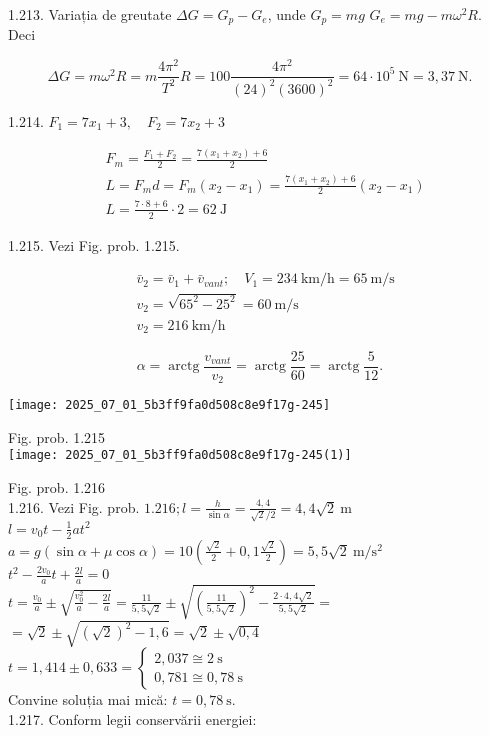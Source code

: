 1.213. Variația de greutate $\Delta G=G_{p}-G_{e}$, unde $G_{p}=m g$ $G_{e}=m g-m \omega^{2} R$. Deci

$$
\Delta G=m \omega^{2} R=m \frac{4 \pi^{2}}{T^{2}} R=100 \frac{4 \pi^{2}}{(24)^{2}(3600)^{2}}=64 \cdot 10^{5} \mathrm{~N}=3,37 \mathrm{~N} .
$$

1.214. $F_{1}=7 x_{1}+3, \quad F_{2}=7 x_{2}+3$

$$
\begin{aligned}
& F_{m}=\frac{F_{1}+F_{2}}{2}=\frac{7\left(x_{1}+x_{2}\right)+6}{2} \\
& L=F_{m} d=F_{m}\left(x_{2}-x_{1}\right)=\frac{7\left(x_{1}+x_{2}\right)+6}{2}\left(x_{2}-x_{1}\right) \\
& L=\frac{7 \cdot 8+6}{2} \cdot 2=62 \mathrm{~J}
\end{aligned}
$$

1.215. Vezi Fig. prob. 1.215.

$$
\begin{aligned}
& \bar{v}_{2}=\bar{v}_{1}+\bar{v}_{v a n t} ; \quad V_{1}=234 \mathrm{~km} / \mathrm{h}=65 \mathrm{~m} / \mathrm{s} \\
& v_{2}=\sqrt{65^{2}-25^{2}}=60 \mathrm{~m} / \mathrm{s} \\
& v_{2}=216 \mathrm{~km} / \mathrm{h}
\end{aligned}
$$

$$
\alpha=\operatorname{arctg} \frac{v_{v a n t}}{v_{2}}=\operatorname{arctg} \frac{25}{60}=\operatorname{arctg} \frac{5}{12} .
$$

\begin{center}
\texttt{[image: 2025\_07\_01\_5b3ff9fa0d508c8e9f17g-245]}
\end{center}

Fig. prob. 1.215\\
\texttt{[image: 2025\_07\_01\_5b3ff9fa0d508c8e9f17g-245(1)]}

Fig. prob. 1.216\\
1.216. Vezi Fig. prob. $1.216 ; l=\frac{h}{\sin \alpha}=\frac{4,4}{\sqrt{2} / 2}=4,4 \sqrt{2} \mathrm{~m}$\\
$l=v_{0} t-\frac{1}{2} a t^{2}$\\
$a=g(\sin \alpha+\mu \cos \alpha)=10\left(\frac{\sqrt{2}}{2}+0,1 \frac{\sqrt{2}}{2}\right)=5,5 \sqrt{2} \mathrm{~m} / \mathrm{s}^{2}$\\
$t^{2}-\frac{2 v_{0}}{a} t+\frac{2 l}{a}=0$\\
$t=\frac{v_{0}}{a} \pm \sqrt{\frac{v_{0}^{2}}{a}-\frac{2 l}{a}}=\frac{11}{5,5 \sqrt{2}} \pm \sqrt{\left(\frac{11}{5,5 \sqrt{2}}\right)^{2}-\frac{2 \cdot 4,4 \sqrt{2}}{5,5 \sqrt{2}}}=$\\
$=\sqrt{2} \pm \sqrt{(\sqrt{2})^{2}-1,6}=\sqrt{2} \pm \sqrt{0,4}$\\
$t=1,414 \pm 0,633=\left\{\begin{array}{l}2,037 \cong 2 \mathrm{~s} \\ 0,781 \cong 0,78 \mathrm{~s}\end{array}\right.$\\
Convine soluția mai mică: $t=0,78 \mathrm{~s}$.\\
1.217. Conform legii conservării energiei:

